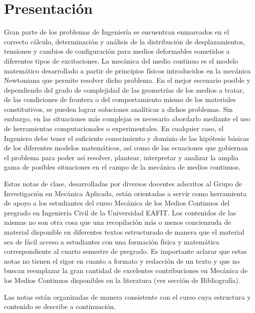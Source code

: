 \section*{Presentación}

Gran parte de los problemas de Ingeniería se encuentran enmarcados en el correcto cálculo, determinación y análisis de la distribución de desplazamientos, tensiones y cambios de configuración para medios deformables sometidos a diferentes tipos de excitaciones.  La mecánica del medio continuo es el modelo matemático desarrollado a partir de principios físicos introducidos en la mecánica Newtoniana que permite resolver dicho problema.  En el mejor escenario posible y dependiendo del grado de complejidad de las geometrías de los medios a tratar, de las condiciones de frontera o del comportamiento mismo de los materiales constitutivos, se pueden lograr soluciones analíticas a dichos problemas.  Sin embargo, en las situaciones más complejas es necesario abordarlo mediante el uso de herramientas computacionales o experimentales.  En cualquier caso, el Ingeniero debe tener el suficiente conocimiento y dominio de las hipótesis básicas de los diferentes modelos matemáticos, así como de las ecuaciones que gobiernan el problema para poder así resolver, plantear, interpretar y analizar la amplia gama de posibles situaciones en el campo de la mecánica de medios continuos.

Estas notas de clase, desarrolladas por diversos docentes adscritos al Grupo de Investigación en Mecánica Aplicada, están orientadas a servir como herramienta de apoyo a los estudiantes del curso Mecánica de los Medios Continuos del pregrado en Ingeniería Civil de la Universidad EAFIT. Los contenidos de las mismas no son otra cosa que una recopilación más o menos concienzuda de material disponible en diferentes textos estructurado de manera que el material sea de fácil acceso a estudiantes con una formación física y matemática correspondiente al cuarto semestre de pregrado. Es importante aclarar que estas notas no tienen el rigor en cuanto a formato y redacción de un texto y que no buscan reemplazar la gran cantidad de excelentes contribuciones en Mecánica de los Medios Continuos disponibles en la literatura (ver sección de Bibliografía).

Las notas están organizadas de manera consistente con el curso cuya estructura y contenido se describe a continuación. 

